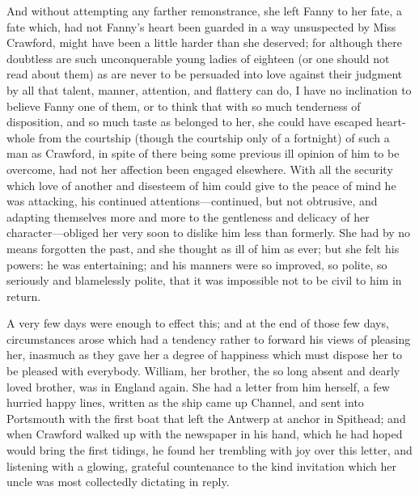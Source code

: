 And without attempting any farther remonstrance, she left
Fanny to her fate, a fate which, had not Fanny's heart
been guarded in a way unsuspected by Miss Crawford,
might have been a little harder than she deserved;
for although there doubtless are such unconquerable young
ladies of eighteen (or one should not read about them)
as are never to be persuaded into love against their judgment
by all that talent, manner, attention, and flattery can do,
I have no inclination to believe Fanny one of them,
or to think that with so much tenderness of disposition,
and so much taste as belonged to her, she could have
escaped heart-whole from the courtship (though the
courtship only of a fortnight) of such a man as Crawford,
in spite of there being some previous ill opinion of him
to be overcome, had not her affection been engaged elsewhere.
With all the security which love of another and disesteem
of him could give to the peace of mind he was attacking,
his continued attentions---continued, but not obtrusive,
and adapting themselves more and more to the gentleness
and delicacy of her character---obliged her very soon
to dislike him less than formerly.  She had by no means
forgotten the past, and she thought as ill of him as ever;
but she felt his powers:  he was entertaining; and his
manners were so improved, so polite, so seriously and
blamelessly polite, that it was impossible not to be civil
to him in return.

A very few days were enough to effect this; and at the end
of those few days, circumstances arose which had a tendency
rather to forward his views of pleasing her, inasmuch as
they gave her a degree of happiness which must dispose
her to be pleased with everybody.  William, her brother,
the so long absent and dearly loved brother, was in
England again.  She had a letter from him herself, a few
hurried happy lines, written as the ship came up Channel,
and sent into Portsmouth with the first boat that left
the Antwerp at anchor in Spithead; and when Crawford walked
up with the newspaper in his hand, which he had hoped
would bring the first tidings, he found her trembling
with joy over this letter, and listening with a glowing,
grateful countenance to the kind invitation which her
uncle was most collectedly dictating in reply.

